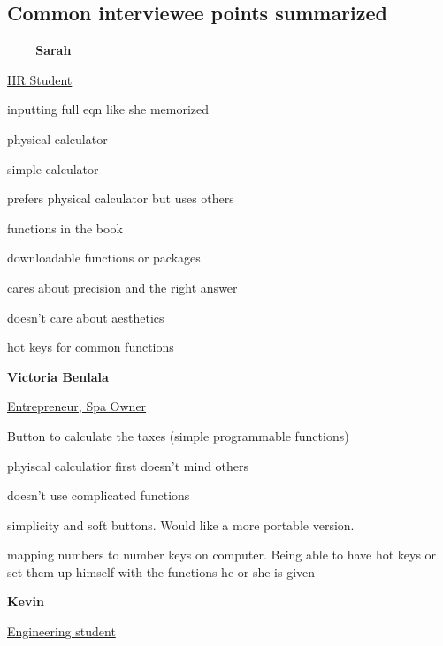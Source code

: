 \documentclass{article}
\begin{document}
\subsection{Common interviewee points summarized}

\textbf{\ \ \ \  Sarah}

\underline{HR Student}

\begin{compactitem}
\item inputting full eqn like she memorized
\item physical calculator 
\item simple calculator
\item prefers physical calculator but uses others
\item functions in the book
\item downloadable functions or packages
\item cares about precision and the right answer
\item doesn’t care about aesthetics
\item hot keys for common functions
\end{compactitem}
\bigskip

\textbf{Victoria  Benlala}

\underline{Entrepreneur, Spa Owner}

\begin{compactitem}
\item Button to calculate the taxes (simple programmable functions)
\item phyiscal calculatior first doesn’t mind others
\item doesn’t use complicated functions
\item simplicity and soft buttons. Would like a more portable version.
\item mapping numbers to number keys on computer. Being able to have hot keys or set them up himself with the functions he or she is given
\end{compactitem}
\bigskip

\textbf{Kevin}

\underline{Engineering student}
\end{document}
